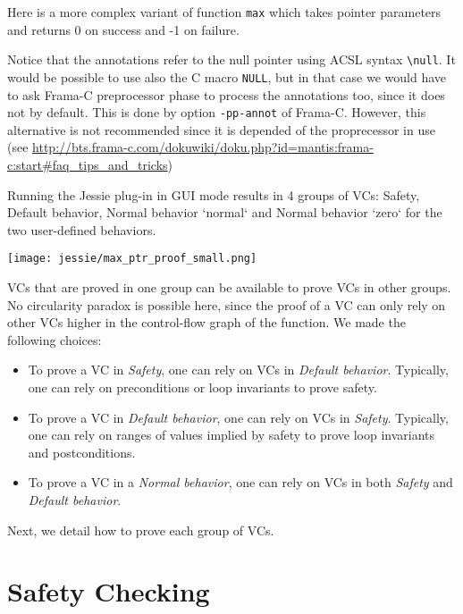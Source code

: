\documentclass[a4paper,11pt,twoside,openright]{report}
\begin{document}
Here is a more complex variant of function \verb|max| which takes
pointer parameters and returns 0 on success and -1 on failure.



Notice that the annotations refer to the null pointer using ACSL
syntax \verb|\null|. It would be possible to use also the C macro
\texttt{NULL}, but in that case we would have to ask Frama-C
preprocessor phase to process the annotations too, since it does not
by default. This is done by option \verb|-pp-annot| of
Frama-C. However, this alternative is not recommended since it is
depended of the proprecessor in use (see \url{http://bts.frama-c.com/dokuwiki/doku.php?id=mantis:frama-c:start#faq_tips_and_tricks})

Running the Jessie plug-in in GUI mode results in 4 groups of VCs:
Safety, Default behavior, Normal behavior `normal` and Normal behavior
`zero` for the two user-defined behaviors.

\begin{center}
  \texttt{[image: jessie/max\_ptr\_proof\_small.png]}
\end{center}

VCs that are proved in one group can be available to prove VCs in other
groups. No circularity paradox is possible here, since the proof of a
VC can only rely on other VCs higher in the control-flow graph of the
function. We made the following choices:

\begin{itemize}
\item To prove a VC in \textit{Safety}, one can rely on VCs in
  \textit{Default behavior}. Typically, one can rely on preconditions
  or loop invariants to prove safety.
\item To prove a VC in \textit{Default behavior}, one can rely on VCs
  in \textit{Safety}. Typically, one can rely on ranges of values
  implied by safety to prove loop invariants and postconditions.
\item To prove a VC in a \textit{Normal behavior}, one can rely on VCs
  in both \textit{Safety} and \textit{Default behavior}.
\end{itemize}

Next, we detail how to prove each group of VCs.

\chapter{Safety Checking}
\end{document}
